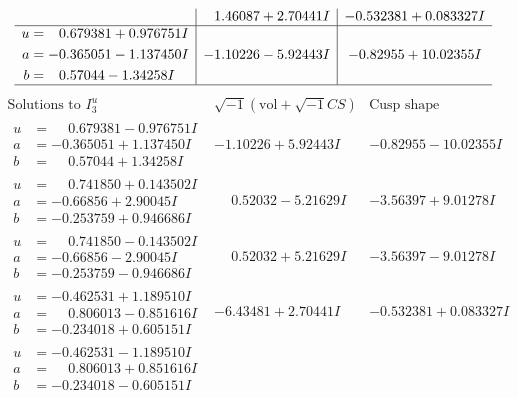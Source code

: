 \documentclass[1p]{elsarticle_modified}
\theoremstyle{definition}
\newcommand{\I}{\sqrt{-1}}
\begin{document}
$$\begin{array}{c|c|c}
 & \phantom{-}1.46087 + 2.70441 I & -0.532381 + 0.083327 I \\ \hline\begin{aligned}
u &= \phantom{-}0.679381 + 0.976751 I \\
a &= -0.365051 - 1.137450 I \\
b &= \phantom{-}0.57044 - 1.34258 I\end{aligned}
 & -1.10226 - 5.92443 I & -0.82955 + 10.02355 I\\
 \hline 
 \end{array}$$\newpage$$\begin{array}{c|c|c}  
\text{Solutions to }I^u_{3}& \I (\text{vol} + \sqrt{-1}CS) & \text{Cusp shape}\\
 \hline 
\begin{aligned}
u &= \phantom{-}0.679381 - 0.976751 I \\
a &= -0.365051 + 1.137450 I \\
b &= \phantom{-}0.57044 + 1.34258 I\end{aligned}
 & -1.10226 + 5.92443 I & -0.82955 - 10.02355 I \\ \hline\begin{aligned}
u &= \phantom{-}0.741850 + 0.143502 I \\
a &= -0.66856 + 2.90045 I \\
b &= -0.253759 + 0.946686 I\end{aligned}
 & \phantom{-}0.52032 - 5.21629 I & -3.56397 + 9.01278 I \\ \hline\begin{aligned}
u &= \phantom{-}0.741850 - 0.143502 I \\
a &= -0.66856 - 2.90045 I \\
b &= -0.253759 - 0.946686 I\end{aligned}
 & \phantom{-}0.52032 + 5.21629 I & -3.56397 - 9.01278 I \\ \hline\begin{aligned}
u &= -0.462531 + 1.189510 I \\
a &= \phantom{-}0.806013 - 0.851616 I \\
b &= -0.234018 + 0.605151 I\end{aligned}
 & -6.43481 + 2.70441 I & -0.532381 + 0.083327 I \\ \hline\begin{aligned}
u &= -0.462531 - 1.189510 I \\
a &= \phantom{-}0.806013 + 0.851616 I \\
b &= -0.234018 - 0.605151 I\end{aligned}

\end{array}$$
\end{document}
